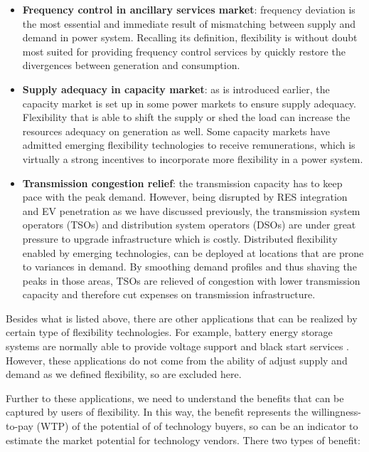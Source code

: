 \begin{itemize}
	\item \textbf{Frequency control in ancillary services market}: frequency deviation is the most essential and immediate result of mismatching between supply and demand in power system. Recalling its definition, flexibility is without doubt most suited for providing frequency control services by quickly restore the divergences between generation and consumption. 
	
	\item \textbf{Supply adequacy in capacity market}: as is introduced earlier, the capacity market is set up in some power markets to ensure supply adequacy. Flexibility that is able to shift the supply or shed the load can increase the resources adequacy on generation as well. Some capacity markets have admitted emerging flexibility technologies to receive remunerations, which is virtually a strong incentives to incorporate more flexibility in a power system.
	
	\item \textbf{Transmission congestion relief}: the transmission capacity has to keep pace with the peak demand. However, being disrupted by RES integration and EV penetration as we have discussed previously, the transmission system operators (TSOs) and distribution system operators (DSOs) are under great pressure to upgrade infrastructure which is costly. Distributed flexibility enabled by emerging technologies, can be deployed at locations that are prone to variances in demand. By smoothing demand profiles and thus shaving the peaks in those areas, TSOs are relieved of congestion with lower transmission capacity and therefore cut expenses on transmission infrastructure.
	
\end{itemize}

Besides what is listed above, there are other applications that can be realized by certain type of flexibility technologies. For example, battery energy storage systems are normally able to provide voltage support and black start services \cite{Eyer2010,Rastler2010,Akhil2015}. However, these applications do not come from the ability of adjust supply and demand as we defined flexibility, so are excluded here.

Further to these applications, we need to understand the benefits that can be captured by users of flexibility. In this way, the benefit represents the willingness-to-pay (WTP) of the potential of of technology buyers, so can be an indicator to estimate the market potential for technology vendors. There two types of benefit:

